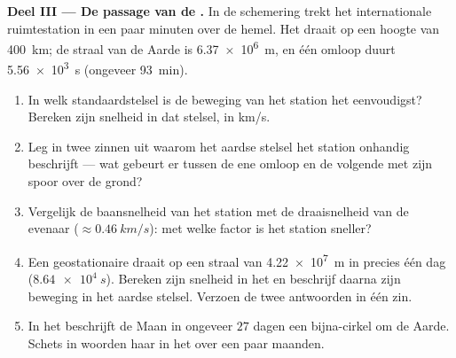 \begin{problem}
\medskip
\noindent\textbf{Deel III --- De passage van de .}
In de schemering trekt het internationale ruimtestation in een paar
minuten over de hemel. Het draait op een hoogte van \qty{400}{km}; de
straal van de Aarde is \qty{6.37e6}{m}, en één omloop duurt
\qty{5.56e3}{s} (ongeveer \qty{93}{min}).
\begin{enumerate}[resume]
  \item In welk standaardstelsel is de beweging van het station het
        eenvoudigst? Bereken zijn snelheid in dat stelsel, in
        \unit{km/s}.
  \item Leg in twee zinnen uit waarom het aardse stelsel het station
        onhandig beschrijft --- wat gebeurt er tussen de ene omloop en de
        volgende met zijn spoor over de grond?
  \item Vergelijk de baansnelheid van het station met de draaisnelheid
        van de evenaar ($\approx \qty{0.46}{km/s}$): met welke factor is
        het station sneller?
  \item Een geostationaire  draait op een straal van
        \qty{4.22e7}{m} in precies één dag ($\qty{8.64e4}{s}$). Bereken
        zijn snelheid in het  en beschrijf daarna
        zijn beweging in het aardse stelsel. Verzoen de twee antwoorden
        in één zin.
  \item In het  beschrijft de Maan in ongeveer $27$
        dagen een bijna-cirkel om de Aarde. Schets in woorden haar 
        in het  over een paar maanden.
\end{enumerate}


\end{problem}
